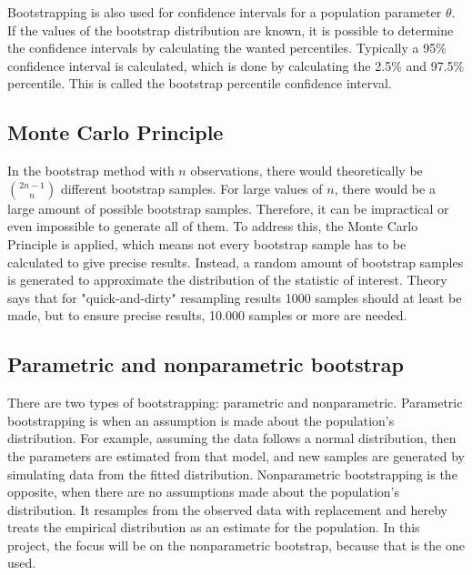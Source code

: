 Bootstrapping is also used for confidence intervals for a population parameter $\theta$. If the values of the bootstrap distribution are known, it is possible to determine the confidence intervals by calculating the wanted percentiles. Typically a 95\% confidence interval is calculated, which is done by calculating the 2.5\% and 97.5\% percentile. This is called the bootstrap percentile confidence interval.

\subsection{Monte Carlo Principle}
In the bootstrap method with $n$ observations, there would theoretically be $\binom{2n-1}{n}$ different bootstrap samples. For large values of $n$, there would be a large amount of possible bootstrap samples. Therefore, it can be impractical or even impossible to generate all of them. To address this, the Monte Carlo Principle is applied, which means not every bootstrap sample has to be calculated to give precise results. Instead, a random amount of bootstrap samples is generated to approximate the distribution of the statistic of interest. Theory says that for "quick-and-dirty" resampling results 1000 samples should at least be made, but to ensure precise results, 10.000 samples or more are needed.

\subsection{Parametric and nonparametric bootstrap}
There are two types of bootstrapping: parametric and nonparametric. Parametric bootstrapping is when an assumption is made about the population's distribution. For example, assuming the data follows a normal distribution, then the parameters are estimated from that model, and new samples are generated by simulating data from the fitted distribution. Nonparametric bootstrapping is the opposite, when there are no assumptions made about the population's distribution. It resamples from the observed data with replacement and hereby treats the empirical distribution as an estimate for the population. In this project, the focus will be on the nonparametric bootstrap, because that is the one used. \newline

